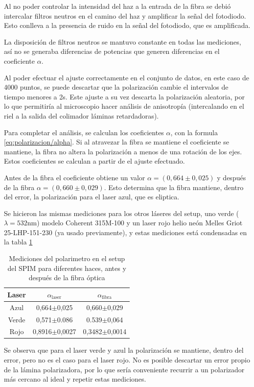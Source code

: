 Al no poder controlar la intensidad del haz a la entrada de la fibra se debió intercalar filtros neutros en el camino del haz y amplificar la señal del fotodiodo. Esto conlleva a la presencia de ruido en la señal del fotodiodo, que es amplificada. 

La disposición de filtros neutros se mantuvo constante en todas las mediciones, así no se generaba diferencias de potencias que generen diferencias en el coeficiente $\alpha$. 

Al poder efectuar el ajuste correctamente en el conjunto de datos, en este caso de 4000 puntos, se puede descartar que la polarización cambie el intervalos de tiempo menores a 2s. Este ajuste a su vez descarta la polarización aleatoria, por lo que permitiría al microscopio hacer análisis de anisotropía (intercalando en el riel a la salida del colimador láminas retardadoras).

Para completar el análisis, se calculan los coeficientes $\alpha$, con la formula \ref{eq:polarizacion/alpha}. Si al atravezar la fibra se mantiene el coeficiente se mantiene, la fibra no altera la polarización a menos de una rotación de los ejes. Estos coeficientes se calculan a partir de el ajuste efectuado. 

Antes de la fibra el coeficiente obtiene un valor $\alpha = (0,664\pm 0,025)$ y después de la fibra $\alpha = (0,660\pm0,029)$. Esto determina que la fibra mantiene, dentro del error, la polarización para el laser azul, que es eliptica.

Se hicieron las mismas mediciones para los otros láseres del setup, uno verde ($\lambda = 532$nm) modelo Coherent 315M-100 y un laser rojo helio neón Melles Griot 25-LHP-151-230 (ya usado previamente), y estas mediciones está condensadas en la tabla \ref{tbl:polarimetro/mediciones}

\begin{table}[H]
    \centering
    \begin{tabular}{c|c|c}
        Laser  & $\alpha_{\text{laser}}$ & $\alpha_{\text{fibra}}$ \\ \hline
        Azul   & 0,664$\pm$0,025   & 0,660$\pm$0,029   \\
        Verde  & 0,571$\pm$0.086   & 0.539$\pm$0,064   \\
        Rojo   & 0,8916$\pm$0,0027 & 0,3482$\pm$0,0014 \\
    \end{tabular}
    \caption{Mediciones del polarimetro en el setup del SPIM para diferentes haces, antes y después de la fibra óptica}
    \label{tbl:polarimetro/mediciones}
\end{table}

Se observa que para el laser verde y azul la polarización se mantiene, dentro del error, pero no es el caso para el laser rojo. No es posible descartar un error propio de la lámina polarizadora, por lo que sería conveniente recurrir a un polarizador más cercano al ideal y repetir estas mediciones.

